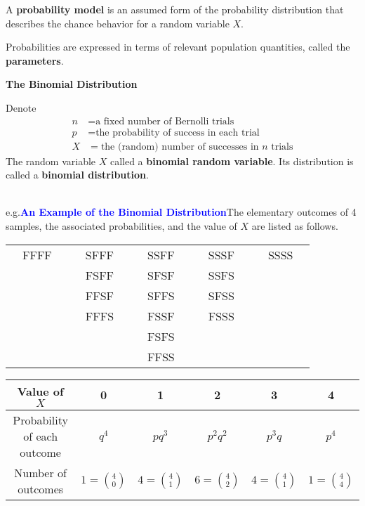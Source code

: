 \documentclass[12pt,openany]{book}
\theoremstyle{definition}
\newcommand{\eg}{\textnormal{e.g.}}
\begin{document}
	\begin{tcolorbox}[colback=white]
		A \textbf{probability model} is an assumed form of the probability distribution that describes the chance behavior for a random variable $X$. \par
		Probabilities are expressed in terms of relevant population quantities, called the \textbf{parameters}.
	\end{tcolorbox}
	\begin{tcolorbox}[colback=white]
		\begin{center}	
			\textbf{The Binomial Distribution}\end{center}
		Denote \begin{align*}
			n &= \text{a fixed number of Bernolli trials} \\
			p &= \text{the probability of success in each trial} \\
			X &= \text{the (random) number of successes in $n$ trials}
		\end{align*} The random variable $X$ called a \textbf{binomial random variable}. Its distribution is called a \textbf{binomial distribution}.
	\end{tcolorbox}\ \\
	\eg\textcolor{blue}{\bf An Example of the Binomial Distribution}\quad The elementary outcomes of 4 samples, the associated probabilities, and the value of $X$ are listed as follows. \begin{center}
		\begin{tabular}{ccc ccc ccc ccc ccc}
			& FFFF &&& SFFF &&& SSFF &&& SSSF &&& SSSS & \\
			& 	   &&& FSFF &&& SFSF &&& SSFS &&& & \\
			& 	   &&& FFSF &&& SFFS &&& SFSS &&& & \\
			& 	   &&& FFFS &&& FSSF &&& FSSS &&& & \\
			& 	   &&&      &&& FSFS &&& &&& & \\
			& 	   &&&      &&& FFSS &&& &&& & \\
	\end{tabular}\end{center}
	\begin{center}\begin{tabular}{c||ccccc}
			\toprule[1.2pt]
			Value of $X$ & 0 & 1 & 2 & 3 & 4 \\
			\hline
			Probability of each outcome & $q^4$ & $pq^3$ & $p^2q^2$ & $p^3q$ & $p^4$ \\
			\hline
			Number of outcomes & $1=\binom{4}{0}$ & $4=\binom{4}{1}$ & $6=\binom{4}{2}$ & $4=\binom{4}{1}$ & $1=\binom{4}{4}$ \\
			\bottomrule[1.2pt] 
	\end{tabular}\end{center}
\end{document}
